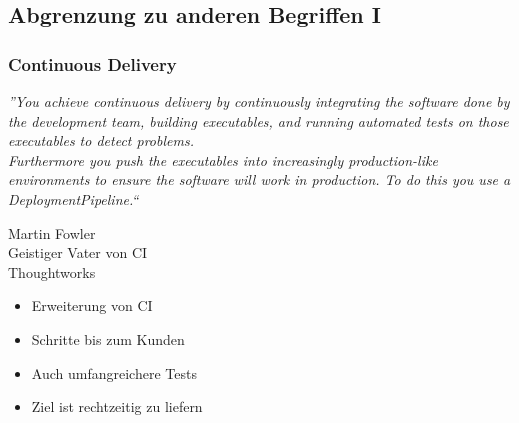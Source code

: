 \documentclass[hyperref={pdfpagelabels=false}]{beamer}
\begin{document}
\subsection{Abgrenzung zu anderen Begriffen I}
\begin{frame} [t]
\frametitle{Continuous Delivery}
 {
\begin{center}
\textit{”You achieve continuous delivery by continuously integrating the software done by the development team, building executables, and running automated tests on those executables to detect problems.\\ Furthermore you push the executables into increasingly production-like environments to ensure the software will work in production. To do this you use a DeploymentPipeline.“}
\end{center}
\vspace{0.5cm} 
\begin{flushright}
\footnotesize{Martin Fowler\\ Geistiger Vater von CI\\ Thoughtworks}
\end{flushright}
}
 {
\vspace{0.5cm} 
\begin{multicols}{2}
\begin{itemize}
	\item Erweiterung von CI
	\item Schritte bis zum Kunden
	\item Auch umfangreichere Tests 
	\item Ziel ist rechtzeitig zu liefern
\end{itemize}
\end{multicols}
}
\end{frame}
\end{document}
